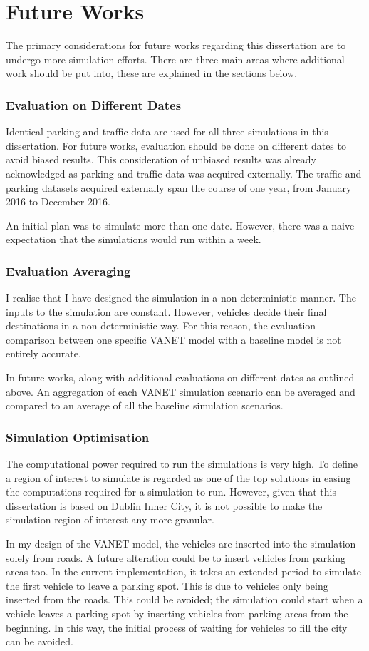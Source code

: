 \section{Future Works}
The primary considerations for future works regarding this dissertation are to undergo more simulation efforts. There are three main areas where additional work should be put into, these are explained in the sections below.

\subsubsection*{Evaluation on Different Dates}
Identical parking and traffic data are used for all three simulations in this dissertation. For future works, evaluation should be done on different dates to avoid biased results. This consideration of unbiased results was already acknowledged as parking and traffic data was acquired externally. The traffic and parking datasets acquired externally span the course of one year, from January 2016 to December 2016.

An initial plan was to simulate more than one date. However, there was a naive expectation that the simulations would run within a week.

\subsubsection*{Evaluation Averaging}
I realise that I have designed the simulation in a non-deterministic manner. The inputs to the simulation are constant. However, vehicles decide their final destinations in a non-deterministic way. For this reason, the evaluation comparison between one specific \ac{VANET} model with a baseline model is not entirely accurate.

In future works, along with additional evaluations on different dates as outlined above. An aggregation of each \ac{VANET} simulation scenario can be averaged and compared to an average of all the baseline simulation scenarios.

\subsubsection*{Simulation Optimisation}
The computational power required to run the simulations is very high. To define a region of interest to simulate is regarded as one of the top solutions in easing the computations required for a simulation to run. However, given that this dissertation is based on Dublin Inner City, it is not possible to make the simulation region of interest any more granular.

In my design of the \ac{VANET} model, the vehicles are inserted into the simulation solely from roads. A future alteration could be to insert vehicles from parking areas too. In the current implementation, it takes an extended period to simulate the first vehicle to leave a parking spot. This is due to vehicles only being inserted from the roads. This could be avoided; the simulation could start when a vehicle leaves a parking spot by inserting vehicles from parking areas from the beginning. In this way, the initial process of waiting for vehicles to fill the city can be avoided.